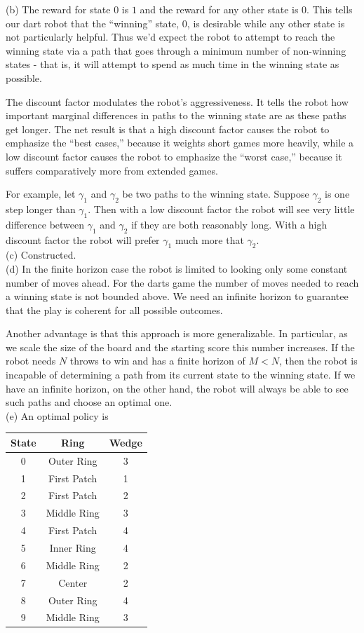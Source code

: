 \documentclass[12pt]{article}
\theoremstyle{remark}
\begin{document}
\noindent (b) The reward for state $0$ is $1$ and the reward for any other state is $0$. This tells our dart robot that the ``winning'' state, $0$, is desirable while any other state is not particularly helpful. Thus we'd expect the robot to attempt to reach the winning state via a path that goes through a minimum number of non-winning states - that is, it will attempt to spend as much time in the winning state as possible.

The discount factor modulates the robot's aggressiveness. It tells the robot how important marginal differences in paths to the winning state are as these paths get longer. The net result is that a high discount factor causes the robot to  emphasize the ``best cases,'' because it weights short games more heavily, while a low discount factor causes the robot to emphasize the ``worst case,'' because it suffers comparatively more from extended games. 

For example, let $\gamma_1$ and $\gamma_2$ be two paths to the winning state. Suppose $\gamma_2$ is one step longer than $\gamma_1$. Then with a low discount factor the robot will see very little difference between $\gamma_1$ and $\gamma_2$ if they are both reasonably long. With a high discount factor the robot will prefer $\gamma_1$ much more that $\gamma_2$. \\

\noindent (c) Constructed. \\

\noindent (d) In the finite horizon case the robot is limited to looking only some constant number of moves ahead. For the darts game the number of moves needed to reach a winning state is not bounded above. We need an infinite horizon to guarantee that the play is coherent for all possible outcomes. 

Another advantage is that this approach is more generalizable. In particular, as we scale the size of the board and the starting score this number increases. If the robot needs $N$ throws to win and has a finite horizon of $M<N$, then the robot is incapable of determining a path from its current state to the winning state. If we have an infinite horizon, on the other hand, the robot will always be able to see such paths and choose an optimal one.\\

\noindent (e) An optimal policy is

\begin{tabular}{c|cc}
State&Ring&Wedge\\
\hline
0&Outer Ring&3\\
1&First Patch&1\\
2&First Patch&2\\
3&Middle Ring&3\\
4&First Patch&4\\
5&Inner Ring&4\\
6&Middle Ring&2\\
7&Center&2\\
8&Outer Ring&4\\
9&Middle Ring&3
\end{tabular}
\end{document}
